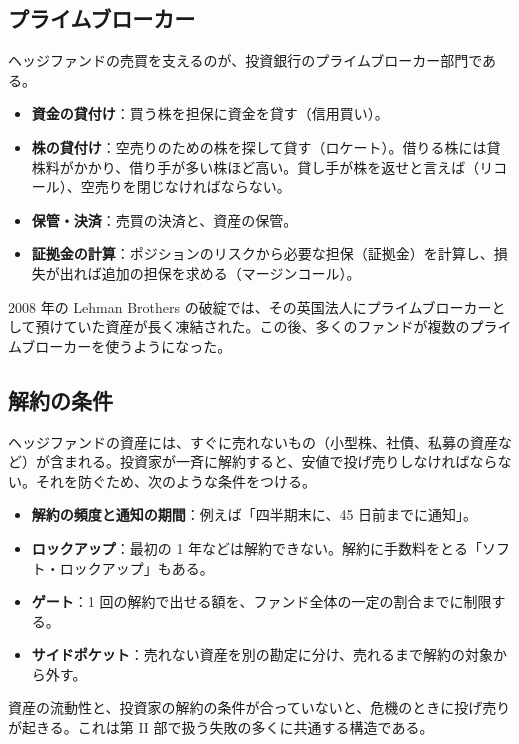 \subsection{プライムブローカー}

ヘッジファンドの売買を支えるのが、投資銀行のプライムブローカー部門である。

\begin{itemize}
\item \textbf{資金の貸付け}：買う株を担保に資金を貸す（信用買い）。
\item \textbf{株の貸付け}：空売りのための株を探して貸す（ロケート）。借りる株には貸株料がかかり、借り手が多い株ほど高い。貸し手が株を返せと言えば（リコール）、空売りを閉じなければならない。
\item \textbf{保管・決済}：売買の決済と、資産の保管。
\item \textbf{証拠金の計算}：ポジションのリスクから必要な担保（証拠金）を計算し、損失が出れば追加の担保を求める（マージンコール）。
\end{itemize}

2008 年の Lehman Brothers の破綻では、その英国法人にプライムブローカーとして預けていた資産が長く凍結された。この後、多くのファンドが複数のプライムブローカーを使うようになった。

\subsection{解約の条件}

ヘッジファンドの資産には、すぐに売れないもの（小型株、社債、私募の資産など）が含まれる。投資家が一斉に解約すると、安値で投げ売りしなければならない。それを防ぐため、次のような条件をつける。

\begin{itemize}
\item \textbf{解約の頻度と通知の期間}：例えば「四半期末に、45 日前までに通知」。
\item \textbf{ロックアップ}：最初の 1 年などは解約できない。解約に手数料をとる「ソフト・ロックアップ」もある。
\item \textbf{ゲート}：1 回の解約で出せる額を、ファンド全体の一定の割合までに制限する。
\item \textbf{サイドポケット}：売れない資産を別の勘定に分け、売れるまで解約の対象から外す。
\end{itemize}

資産の流動性と、投資家の解約の条件が合っていないと、危機のときに投げ売りが起きる。これは第 II 部で扱う失敗の多くに共通する構造である。

